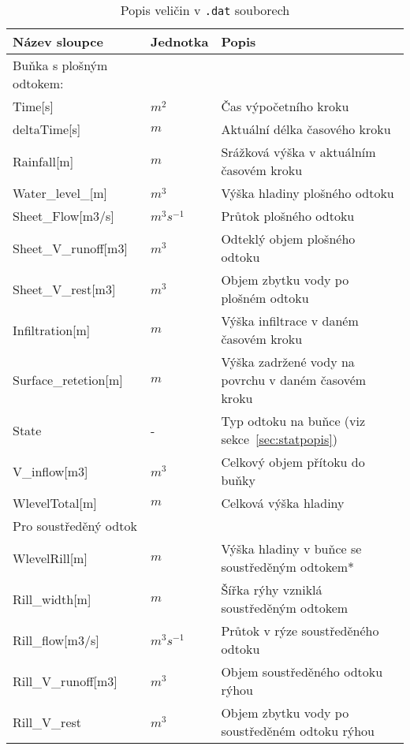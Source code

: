 \begin{table}
 

 \centering
 \caption{Popis veličin  v {\tt.dat} souborech}
\label{tab:vystupydat}

 \begin{tabular}{llp{}}
  \hline  \hline
 Název sloupce    & Jednotka    & Popis       \\ 
 \hline
 Buňka s plošným odtokem:	 &&\\ \hline
 Time[s]          &   $m^2$      &  Čas výpočetního kroku          \\
 deltaTime[s]     &   $m$        &  Aktuální délka časového kroku  \\
 Rainfall[m]      &  $m$         &  Srážková výška v aktuálním časovém kroku \\
 Water\_level\_[m]       &  $m^3$  & Výška hladiny plošného odtoku \\
 Sheet\_Flow[m3/s]       &  $m^3s^{-1}$  & Průtok plošného odtoku  \\
 Sheet\_V\_runoff[m3]    &  $m^3$     & Odteklý objem plošného odtoku \\
 Sheet\_V\_rest[m3]      &  $m^3$     & Objem zbytku vody po plošném odtoku \\
 Infiltration[m]         &  $m$      & Výška infiltrace v daném časovém kroku \\
 Surface\_retetion[m]    &  $m$      & Výška zadržené vody na povrchu v daném časovém kroku \\
 State                   &  -         & Typ odtoku na buňce (viz sekce~\ref{sec:statpopis})  \\
 V\_inflow[m3]   &   $m^3$ &  Celkový objem přítoku do buňky \\
 WlevelTotal[m]	  &   $m$	&  Celková výška hladiny  \\  \hline
 Pro soustředěný odtok &&\\ \hline 
 WlevelRill[m]         &   $m$       &  Výška hladiny v buňce se soustředěným odtokem* \\
 Rill\_width[m]	       &   $m$ &  Šířka rýhy vzniklá soustředěným odtokem\\
 Rill\_flow[m3/s]      &   $m^3s^{-1}$       &  Průtok v rýze soustředěného odtoku \\
 Rill\_V\_runoff[m3]   &   $m^3$  &   Objem soustředěného odtoku rýhou \\
 Rill\_V\_rest   &  $m^3$ &   Objem zbytku vody po soustředěném odtoku rýhou  \\

\end{tabular}
\end{table}

